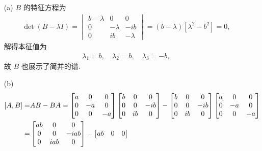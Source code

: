 \documentclass{assignment}
\begin{document}
\begin{sol}
    \begin{itemize}
        \item[(a)] $B$ 的特征方程为
        \begin{align}
            \det(B-\lambda I)=\begin{vmatrix}
                b-\lambda&0&0\\
                0&-\lambda&-ib\\
                0&ib&-\lambda
            \end{vmatrix}=(b-\lambda)[\lambda^2-b^2]=0,
        \end{align}
        解得本征值为
        \begin{align}
            \lambda_1=b,\quad\lambda_2=b,\quad\lambda_3=-b,
        \end{align}
        故 $B$ 也展示了简并的谱.
        \item[(b)] 
        \begin{align}
            \notag[A,B]=&AB-BA=\begin{bmatrix}
                a&0&0\\
                0&-a&0\\
                0&0&-a
            \end{bmatrix}\begin{bmatrix}
                b&0&0\\
                0&0&-ib\\
                0&ib&0
            \end{bmatrix}-\begin{bmatrix}
                b&0&0\\
                0&0&-ib\\
                0&ib&0
            \end{bmatrix}\begin{bmatrix}
                a&0&0\\
                0&-a&0\\
                0&0&-a
            \end{bmatrix}\\
            =&\begin{bmatrix}
                ab&0&0\\
                0&0&-iab\\
                0&iab&0
            \end{bmatrix}-\begin{bmatrix}
                ab&0&0\\

\end{bmatrix}
\end{align}
\end{itemize}
\end{sol}
\end{document}
